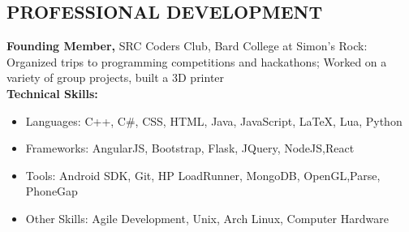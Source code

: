 \documentclass{res}
\begin{document}
\begin{resume}
\section{PROFESSIONAL DEVELOPMENT} 
{\bf Founding Member,} SRC Coders Club, Bard College at Simon's Rock: Organized trips to programming competitions and hackathons; Worked on a variety of group projects, built a 3D printer\\
{\bf Technical Skills:} 
\begin{itemize}
\item Languages: C++, C\#, CSS, HTML, Java, JavaScript, \LaTeX, Lua, Python
\item Frameworks: AngularJS, Bootstrap, Flask, JQuery, NodeJS,React
\item Tools: Android SDK, Git, HP LoadRunner, MongoDB, OpenGL,Parse, PhoneGap
\item Other Skills: Agile Development, Unix, Arch Linux, Computer Hardware
\end{itemize}
\end{resume}
\end{document}
